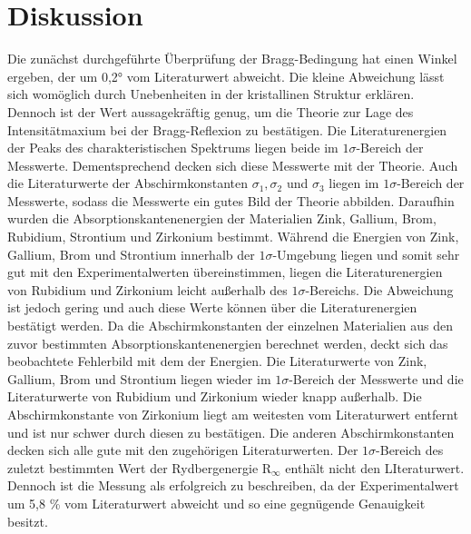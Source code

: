 \documentclass[titlepage = firstcover]{scrartcl}
\begin{document}
          \section{Diskussion}
            Die zunächst durchgeführte Überprüfung der Bragg-Bedingung hat einen Winkel ergeben, der um 0,2° vom Literaturwert abweicht. Die kleine Abweichung lässt sich womöglich durch Unebenheiten
            in der kristallinen Struktur erklären. Dennoch ist der Wert aussagekräftig genug, um die Theorie zur Lage des Intensitätmaxium bei der Bragg-Reflexion zu bestätigen. Die Literaturenergien 
            der Peaks des charakteristischen Spektrums liegen beide im $1\sigma$-Bereich der Messwerte. Dementsprechend decken sich diese Messwerte mit der Theorie. Auch die Literaturwerte der 
            Abschirmkonstanten $\sigma_1, \sigma_2$ und $\sigma_3$ liegen im $1\sigma$-Bereich der Messwerte, sodass die Messwerte ein gutes Bild der Theorie abbilden.
            Daraufhin wurden die Absorptionskantenenergien der Materialien Zink, Gallium, Brom, Rubidium, Strontium und Zirkonium bestimmt. Während die Energien von Zink, Gallium, Brom und Strontium
            innerhalb der $1\sigma$-Umgebung liegen und somit sehr gut mit den Experimentalwerten übereinstimmen, liegen die Literaturenergien von Rubidium und Zirkonium leicht außerhalb des 
            $1\sigma$-Bereichs. Die Abweichung ist jedoch gering und auch diese Werte können über die Literaturenergien bestätigt werden. Da die Abschirmkonstanten der einzelnen Materialien aus 
            den zuvor bestimmten Absorptionskantenenergien berechnet werden, deckt sich das beobachtete Fehlerbild mit dem der Energien. Die Literaturwerte von Zink, Gallium, Brom und Strontium
            liegen wieder im $1\sigma$-Bereich der Messwerte und die Literaturwerte von Rubidium und Zirkonium wieder knapp außerhalb. Die Abschirmkonstante von Zirkonium liegt am weitesten vom 
            Literaturwert entfernt und ist nur schwer durch diesen zu bestätigen. Die anderen Abschirmkonstanten decken sich alle gute mit den zugehörigen Literaturwerten. Der $1\sigma$-Bereich 
            des zuletzt bestimmten Wert der Rydbergenergie $\text{R}_{\infty}$ enthält nicht den LIteraturwert. Dennoch ist die Messung als erfolgreich zu beschreiben, da der Experimentalwert um
            5,8 \% vom Literaturwert abweicht und so eine gegnügende Genauigkeit besitzt. 
\end{document}
